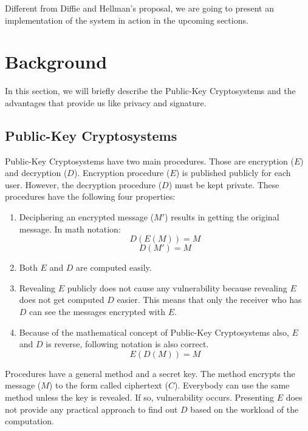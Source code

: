 \documentclass[12pt, letterpaper]{article}
\begin{document}
Different from Diffie and Hellman’s proposal, we are going to present an implementation of the system in action in the upcoming sections.

\section{Background}

In this section, we will briefly describe the Public-Key Cryptosystems and the advantages that provide us like privacy and signature.

\subsection{Public-Key Cryptosystems}

Public-Key Cryptosystems have two main procedures. Those are encryption ($E$) and decryption ($D$). Encryption procedure ($E$) is published publicly for each user. However, the decryption procedure ($D$) must be kept private. These procedures have the following four properties:

\renewcommand{\theenumi}{\alph{enumi}}
\begin{enumerate}
\item   
Deciphering an encrypted message ($M'$) results in getting the original message. In math notation:
\begin{equation}
D(E(M)) = M
\end{equation}
\[ D(M') = M \]   
    
\item
Both $E$ and $D$ are computed easily.

\item
Revealing $E$ publicly does not cause any vulnerability because revealing $E$ does not get computed $D$ easier. This means that only the receiver who has $D$ can see the messages encrypted with $E$.

\item
Because of the mathematical concept of Public-Key Cryptosystems also, $E$ and $D$ is reverse, following notation is also correct.
\begin{equation}
E(D(M)) = M
\end{equation}
\end{enumerate}

Procedures have a general method and a secret key. The method encrypts the message ($M$) to the form called ciphertext ($C$). Everybody can use the same method unless the key is revealed. If so, vulnerability occurs. Presenting $E$ does not provide any practical approach to find out $D$ based on the workload of the computation.
\end{document}
